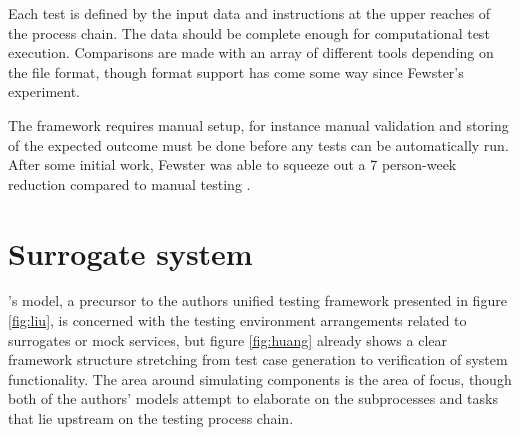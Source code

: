 \documentclass[12pt,a4paper,oneside,pdftex]{report}
\begin{document}
Each test is defined by the input data and instructions at the upper reaches of the process chain. The data should be complete enough for computational test execution. Comparisons are made with an array of different tools depending on the file format, though format support has come some way since Fewster's experiment.

The framework requires manual setup, for instance manual validation and storing of the expected outcome must be done before any tests can be automatically run. After some initial work, Fewster was able to squeeze out a 7 person-week reduction compared to manual testing \citep{fewster1999software}.

\section{Surrogate system}

\citeauthor{huang2008surrogate}'s \citeyearpar{huang2008surrogate} model, a precursor to the authors unified testing framework presented in figure \ref{fig:liu}, is concerned with the testing environment arrangements related to surrogates or mock services, but figure \ref{fig:huang} already shows a clear framework structure stretching from test case generation to verification of system functionality. The area around simulating components is the area of focus, though both of the authors' models attempt to elaborate on the subprocesses and tasks that lie upstream on the testing process chain. \citep{huang2008surrogate}

\begin{comment}
\begin{figure}[H]
\centering
\pgfdeclarelayer{marx}
\pgfsetlayers{main,marx}
\begin{tikzpicture}[
    start chain=going below,    %
    node distance=3mm and 30mm, %
    ]
\tikzset{
  base/.style={draw, on chain, on grid, align=center, minimum height=4ex},
  proc/.style={base, rectangle, minimum height=4em, text width=4em},
  cont/.style={base, rectangle, rounded corners, minimum height=4em, minimum width=6em, text width=6em},
  elli/.style={base, ellipse, minimum height=4.5em, text width=4.5em},
  line/.style={draw, thick, -latex'}
}
\node [proc] (desc) {Service description};
\node [proc] (tcs) {Configured test cases};
\node [proc, right=of desc] (gen) {Generator};
\node [proc] (ten) {Test engine};
\node [cont, right=of gen] (app) {Application container};
\node [proc] (sgt) {Surrogate};
\node [proc] (sen) {Surrogate engine};
\node [proc, right=of sgt] (rea) {Real component};
\path [line] (desc) -- (gen);
\path [line] (gen) -- (sgt);
\path [line] (tcs) -- (ten);
\path [line] (ten) -- (sen);
\path [line] (sgt) -- (sen);
\path [line] (sen) -- (sgt);
\end{tikzpicture}
\caption{Surrogate system architecture \citep{huang2008surrogate}} \label{fig:surrogate}
\end{figure}
\end{comment}
\end{document}
